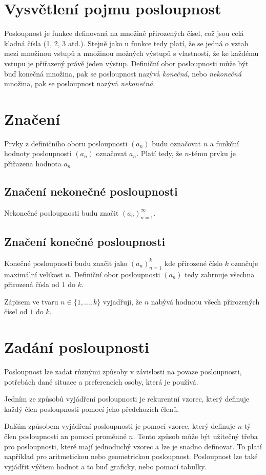 \documentclass[12pt]{report}			%
\begin{document}
		\section{Vysvětlení pojmu posloupnost}
Posloupnost je funkce definovaná na množině přirozených čísel, což jsou celá kladná čísla (1, 2, 3 atd.). Stejně jako u funkce tedy platí, že se jedná o vztah mezi množinou vstupů a množinou možných výstupů s vlastností, že ke každému vstupu je přiřazený právě jeden výstup. Definiční obor posloupnosti může být buď konečná množina, pak se posloupnost nazývá \emph{konečná}, nebo \emph{nekonečná} množina, pak se posloupnost nazývá \emph{nekonečná}.
		\section{Značení}
Prvky z definičního oboru posloupnosti $(a_n)$ budu označovat $n$ a funkční hodnoty posloupnosti $(a_n)$ označovat $a_n$. Platí tedy, že $n$-tému prvku je přiřazena hodnota $a_n$.
		\subsection{Značení nekonečné posloupnosti}
Nekonečné posloupnosti budu značit $(a_n)_{n=1}^{\infty} $.
		\subsection{Značení konečné posloupnosti}
Konečné posloupnosti budu značit jako $(a_n)_{n=1}^k$ kde přirozené číslo $k$ označuje maximální velikost $n$. Definiční obor posloupnosti $(a_n)$ tedy zahrnuje všechna přirozená čísla od $1$ do $k$. 

Zápisem ve tvaru $n \in \{1, \dots, k\}$ vyjadřuji, že $n$ nabývá hodnotu všech přirozených čísel od $1$ do $k$.

\section{Zadání posloupnosti}
Posloupnost lze zadat různými způsoby v závislosti na povaze posloupnosti, potřebách dané situace a preferencích osoby, která je používá.

Jedním ze způsobů vyjádření posloupnosti je rekurentní vzorec, který definuje každý člen posloupnosti pomocí jeho předchozích členů. 

Dalším způsobem vyjádření posloupnosti je pomocí vzorce, který definuje $n$-tý člen posloupnosti an pomocí proměnné $n$. Tento způsob může být užitečný třeba pro posloupnosti, které mají jednoduchý vzorec a lze je snadno definovat. To platí například pro aritmetickou nebo geometrickou posloupnost. 
Posloupnost lze také vyjádřit výčtem hodnot a to buď graficky, nebo pomocí tabulky.  
\end{document}
